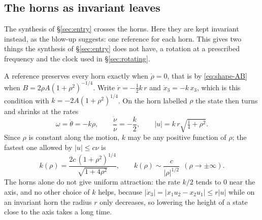 \documentclass[11pt,reqno]{amsart}
\theoremstyle{plain}
\theoremstyle{definition}
\theoremstyle{remark}
\begin{document}
\subsection{The horns as invariant leaves}\label{sec:leaf}
The synthesis of \S\ref{sec:entry} crosses the horns. Here they are kept invariant instead, as the
blow-up suggests: one reference for each horn. This gives two things the synthesis of \S\ref{sec:entry}
does not have, a rotation at a prescribed frequency and the clock used in \S\ref{sec:rotating}.

A reference preserves every horn exactly when $\dot\rho=0$, that is by \eqref{eq:shape-AB} when
$B=2\rho A(1+\rho^{2})^{-1/4}$. Write $\dot r=-\frac12k\,r$ and $\dot x_3=-k\,x_3$, which is this condition
with $k=-2A(1+\rho^{2})^{1/4}$. On the horn labelled $\rho$ the state then turns and shrinks at the rates
\begin{equation}\label{eq:leafclock}
  \omega=\dot\theta=-k\rho,\qquad \frac{\dot\nu}{\nu}=-\frac k2,\qquad |u|=k\,r\sqrt{\tfrac14+\rho^{2}} .
\end{equation}
Since $\rho$ is constant along the motion, $k$ may be any positive function of $\rho$; the fastest one
allowed by $|u|\le c\nu$ is
\begin{equation}\label{eq:kopt}
  k(\rho)=\frac{2c\,(1+\rho^{2})^{1/4}}{\sqrt{1+4\rho^{2}}},\qquad
  k(\rho)\sim\frac{c}{|\rho|^{1/2}}\ \ (\rho\to\pm\infty).
\end{equation}
The horns alone do not give uniform attraction: the rate $k/2$ tends to $0$ near the axis, and no other
choice of $k$ helps, because $|\dot x_3|=|x_1u_2-x_2u_1|\le r|u|$ while on an invariant horn the radius $r$
only decreases, so lowering the height of a state close to the axis takes a long time.
\end{document}
